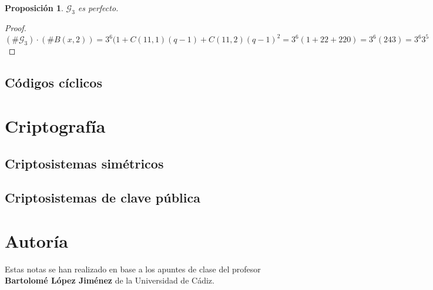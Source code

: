 \documentclass[spanish]{book}
\newtheorem{proposi}{Proposición}
\begin{document}
\begin{proposi}
	$\mathcal{G}_3$ es perfecto.
\end{proposi}

\begin{proof}
	$(\# \mathcal{G}_3 ) \cdot (\# B(x, 2))=3^6(1+C(11, 1)(q-1)+C(11, 2)(q-1)^2=3^6(1+22+220)=3^6(243)=3^6 3^5$
\end{proof}
\section{Códigos cíclicos}

\chapter{Criptografía}
\section{Criptosistemas simétricos}
\section{Criptosistemas de clave pública}

\chapter*{Autoría}
Estas notas se han realizado en base a los apuntes de clase del profesor \textbf{Bartolomé López Jiménez} de la Universidad de Cádiz.
\end{document}
